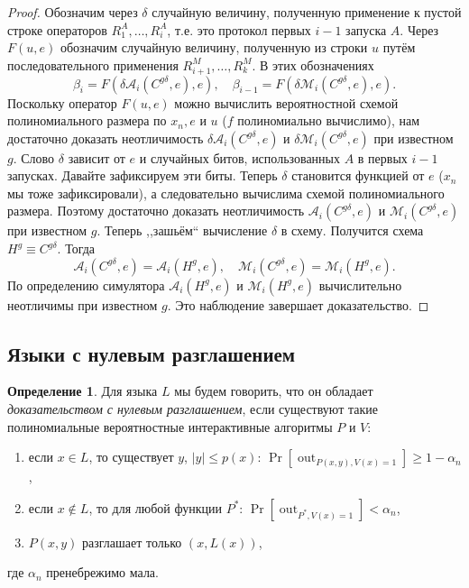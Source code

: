 \documentclass[12pt,a4paper]{article}
\DeclareMathOperator{\out}{out}
\theoremstyle{definition}
\newtheorem{definition}{Определение}[section]
\theoremstyle{plain}
\theoremstyle{remark}
\begin{document}
\begin{proof}
Обозначим через $\delta$ случайную величину, полученную применение к пустой 
строке операторов $R^A_1, \dotsc, R^A_i$, т.е. это протокол первых $i-1$ запуска $A$.
Через $F(u,e)$ обозначим случайную 
величину, полученную из строки $u$ путём последовательного применения 
$R^M_{i+1}, \dotsc, R^M_k$. В этих обозначениях
$$\beta_i     = F(\delta \mathcal A_i(C^{g\delta},e),e), \quad 
  \beta_{i-1} = F(\delta \mathcal M_i(C^{g\delta},e),e).$$
Поскольку оператор $F(u,e)$ можно вычислить вероятностной схемой 
полиномиального размера по $x_n, e$ и $u$ ($f$ полиномиально вычислимо), 
нам достаточно доказать неотличимость $\delta \mathcal A_i(C^{g\delta},e)$ и 
$\delta \mathcal M_i(C^{g\delta},e)$ при известном $g$. Слово $\delta$ зависит 
от $e$ и случайных битов, использованных $A$ в первых $i-1$ запусках. 
Давайте зафиксируем эти биты. Теперь $\delta$ становится
функцией от $e$ ($x_n$ мы тоже зафиксировали), а следовательно вычислима схемой полиномиального размера.
Поэтому достаточно доказать неотличимость $\mathcal A_i(C^{g\delta},e)$ и $\mathcal M_i(C^{g\delta},e)$ при известном $g$. Теперь ,,зашьём`` вычисление $\delta$ в схему. Получится схема $H^g \equiv C^{g\delta}$.
Тогда $$\mathcal A_i(C^{g\delta}, e) = \mathcal A_i(H^{g},e),\quad \mathcal M_i(C^{g\delta}, e) = \mathcal M_i(H^{g},e).$$
По определению симулятора $\mathcal A_i(H^{g},e)$ и $\mathcal M_i(H^{g},e)$ вычислительно неотличимы при известном $g$.
Это наблюдение завершает доказательство.
\end{proof}

\subsection{Языки с нулевым разглашением}
\begin{definition}
Для языка $L$ мы будем говорить, что он обладает \emph{доказательством с нулевым разглашением},
если существуют такие полиномиальные вероятностные интерактивные алгоритмы $P$ и $V$:
\begin{enumerate}
\item если $x\in L$, то существует $y$, $|y|\le p(x)$: $\Pr[\out_{P(x, y), V(x) = 1}]\ge 1-\alpha_n$,
\item если $x\not\in L$, то для любой функции $P^*$: $\Pr[\out_{P^*, V(x) = 1}] < \alpha_n$,
\item $P(x, y)$ разглашает только $(x, L(x))$,
\end{enumerate}
где $\alpha_n$ пренебрежимо мала.
\end{definition}
\end{document}
